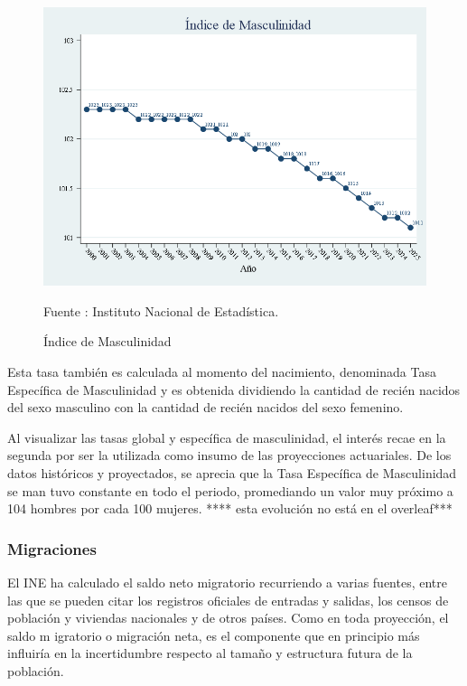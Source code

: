 \begin{figure}[H]
\begin{center}
                    \caption{Índice de Masculinidad}
                    \includegraphics[scale=0.45]{INE_indic_masc.png}
                                    \item \footnotesize Fuente : Instituto Nacional de Estadística.
                    \end{center}
\end{figure}

Esta tasa también es calculada al momento del nacimiento, denominada
Tasa Específica de Masculinidad y es obtenida dividiendo la cantidad de
recién nacidos del sexo masculino con la cantidad de recién nacidos del
sexo femenino.

Al visualizar las tasas global y específica de masculinidad, el interés
recae en la segunda por ser la utilizada como insumo de las proyecciones
actuariales. De los datos históricos y proyectados, se aprecia que la
Tasa Específica de Masculinidad se man tuvo constante en todo el
periodo, promediando un valor muy próximo a 104 hombres por cada 100
mujeres. **** esta evolución no está en el overleaf***

\subsubsection{Migraciones}

El INE ha calculado el saldo neto migratorio recurriendo a varias
fuentes, entre las que se pueden citar los registros oficiales de
entradas y salidas, los censos de población y viviendas nacionales y de
otros países. Como en toda proyección, el saldo m igratorio o migración
neta, es el componente que en principio más influiría en la
incertidumbre respecto al tamaño y estructura futura de la población.

